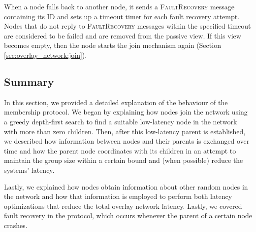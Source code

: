 When a node falls back to another node, it sends a \textsc{FaultRecovery} message containing its ID and sets up a timeout timer for each fault recovery attempt. Nodes that do not reply to \textsc{FaultRecovery} messages within the specified timeout are considered to be failed and are removed from the passive view. If this view becomes empty, then the node starts the join mechanism again (Section \ref{sec:overlay_network:join}).

\subsection{Summary}

In this section, we provided a detailed explanation of the behaviour of the membership protocol. We began by explaining how nodes join the network using a greedy depth-first search to find a suitable low-latency node in the network with more than zero children. Then, after this low-latency parent is established, we described how information between nodes and their parents is exchanged over time and how the parent node coordinates with its children in an attempt to maintain the group size within a certain bound and (when possible) reduce the systems' latency.

Lastly, we explained how nodes obtain information about other random nodes in the network and how that information is employed to perform both latency optimizations that reduce the total overlay network latency. Lastly, we covered fault recovery in the protocol, which occurs whenever the parent of a certain node crashes.